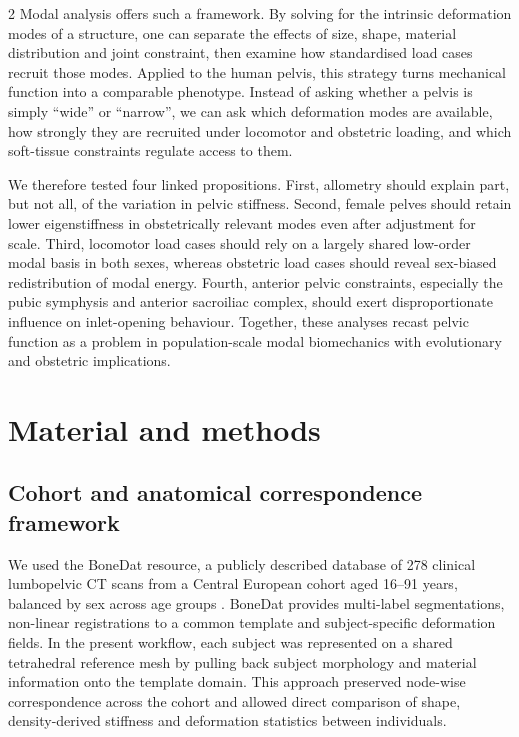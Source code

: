 \documentclass[openacc]{rsproca_new}
\begin{document}
\begin{multicols}{2}
Modal analysis offers such a framework. By solving for the intrinsic deformation modes of a structure, one can separate the effects of size, shape, material distribution and joint constraint, then examine how standardised load cases recruit those modes. Applied to the human pelvis, this strategy turns mechanical function into a comparable phenotype. Instead of asking whether a pelvis is simply ``wide'' or ``narrow'', we can ask which deformation modes are available, how strongly they are recruited under locomotor and obstetric loading, and which soft-tissue constraints regulate access to them.

We therefore tested four linked propositions. First, allometry should explain part, but not all, of the variation in pelvic stiffness. Second, female pelves should retain lower eigenstiffness in obstetrically relevant modes even after adjustment for scale. Third, locomotor load cases should rely on a largely shared low-order modal basis in both sexes, whereas obstetric load cases should reveal sex-biased redistribution of modal energy. Fourth, anterior pelvic constraints, especially the pubic symphysis and anterior sacroiliac complex, should exert disproportionate influence on inlet-opening behaviour. Together, these analyses recast pelvic function as a problem in population-scale modal biomechanics with evolutionary and obstetric implications.

\section{Material and methods}

\subsection{Cohort and anatomical correspondence framework}

We used the BoneDat resource, a publicly described database of 278 clinical lumbopelvic CT scans from a Central European cohort aged 16--91 years, balanced by sex across age groups \cite{HenysKuchar2025}. BoneDat provides multi-label segmentations, non-linear registrations to a common template and subject-specific deformation fields. In the present workflow, each subject was represented on a shared tetrahedral reference mesh by pulling back subject morphology and material information onto the template domain. This approach preserved node-wise correspondence across the cohort and allowed direct comparison of shape, density-derived stiffness and deformation statistics between individuals.


\end{multicols}
\end{document}
